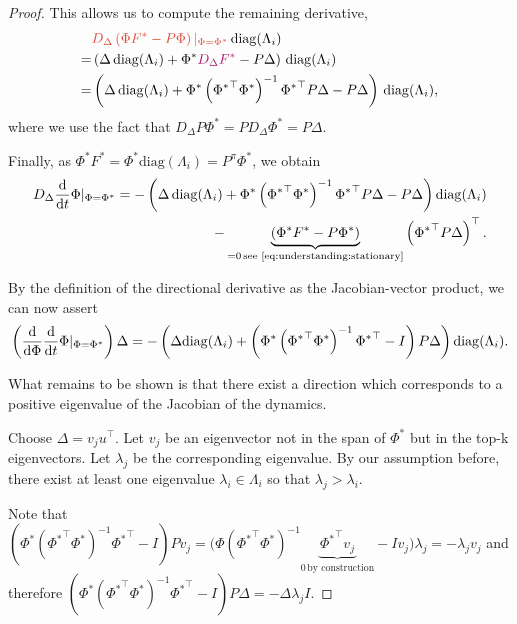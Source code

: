 \begin{proof}
This allows us to compute the remaining derivative,
\begin{align}
    &{\color{uoftred}D_\Delta \left(\Phi F^* - P \Phi\right)|_{\Phi=\Phi^*}}\, \mathrm{diag}(\Lambda_i)\\
    = & \left(\Delta\, \mathrm{diag}(\Lambda_i) + \Phi^*{\color{uoftmagenta} D_\Delta F^*}  - P\Delta \right)\,\mathrm{diag}(\Lambda_i)\\
    = & \left(\Delta\, \mathrm{diag}(\Lambda_i) + \Phi^*\left({\Phi^*}^\top {\Phi^*}\right)^{-1}{\Phi^*}^\top P \Delta  - P\Delta \right)\,\mathrm{diag}(\Lambda_i),
\end{align}
where we use the fact that $D_\Delta P\Phi^* = P D_\Delta \Phi^* = P \Delta$.

Finally, as $\Phi^*F^* = \Phi^* \mathrm{diag}(\Lambda_i) = P^\pi \Phi^*$, we obtain
\begin{align}
 D_\Delta \ddt{t} \Phi |_{\Phi=\Phi^*} =   -\left(\Delta\, \mathrm{diag}(\Lambda_i) + {\Phi^*}\left({\Phi^*}^\top \Phi^*\right)^{-1}{\Phi^*}^\top P \Delta  - P\Delta \right)\mathrm{diag}(\Lambda_i) \\- \underbrace{\left(\Phi^* F^* - P \Phi^*\right)}_{=0\,\text{see \autoref{eq:understanding:stationary}}}\left({\Phi^*}^\top P \Delta\right)^\top.
\end{align}


By the definition of the directional derivative as the Jacobian-vector product, we can now assert
\begin{align}
    \left(\frac{\mathrm{d}}{\mathrm{d} \Phi} \frac{\mathrm{d}}{\mathrm{d} t}\Phi |_{\Phi=\Phi^*}\right) \Delta = - \left(\Delta \mathrm{diag}(\Lambda_i) + \left(\Phi^*\left({\Phi^*}^\top {\Phi^*}\right)^{-1}{\Phi^*}^\top - I\right) P \Delta\right)\mathrm{diag}(\Lambda_i).
\end{align}

What remains to be shown is that there exist a direction which corresponds to a positive eigenvalue of the Jacobian of the dynamics.

Choose $\Delta = v_j u^\top$. Let $v_j$ be an eigenvector not in the span of $\Phi^*$ but in the top-k eigenvectors. Let  $\lambda_j$ be the corresponding eigenvalue. By our assumption before, there exist at least one eigenvalue $\lambda_i \in \Lambda_i$ so that $\lambda_j > \lambda_i$.

Note that $\left(\Phi^*\left({\Phi^*}^\top {\Phi^*}\right)^{-1}{\Phi^*}^\top - I\right) P v_j = \Big(\Phi\left({\Phi^*}^\top {\Phi^*}\right)^{-1}\underbrace{{\Phi^*}^\top v_j}_{0\, \text{by construction}} - I v_j\Big) \lambda_j = -\lambda_j v_j$ and therefore $\left(\Phi^*\left({\Phi^*}^\top \Phi^*\right)^{-1}{\Phi^*}^\top - I\right) P \Delta = -\Delta \lambda_j I.$


\end{proof}
